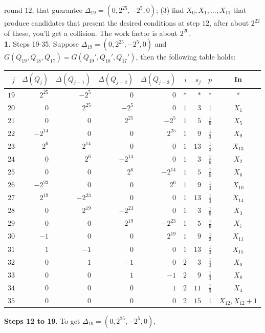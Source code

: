round $12$, that guarantee $\Delta_{19}= (0, 2^{25}, -2^5,0)$; (3)
find $X_0, X_1, \ldots , X_{11}$ that produce candidates that present the desired
conditions at step $12$, after about $2^{22}$ of these, you'll get a collision.
The work factor is about $2^{20}$. \\
{\bf 1.}  Steps 19-35.  Suppose 
$\Delta_{19}= (0, 2^{25}, -2^5,0)$ and 
$G(Q_{19}, Q_{18}, Q_{17})= G(Q_{19}', Q_{18}', Q_{17}')$, then the following table
holds:
\begin{center}
\begin{tabular} {|r|rrrr|rrcc|}
\hline
$j$&$\Delta(Q_{j})$&$\Delta(Q_{j-1})$&$\Delta(Q_{j-2})$&$\Delta(Q_{j-3})$&$i$&$s_j$&$p$&In\\
\hline
$19$& $2^{25}$&$-2^5$&$0$&$0$&$*$&$*$&$*$&$*$\\
$20$& $0$&$2^{25}$&$-2^5$&$0$&$1$&$3$&$1$&$X_{1}$\\
$21$& $0$&$0$&$2^{25}$&$-2^5$& $1$&$5$&${\frac 1 9}$&$X_{5}$\\
$22$& $-2^{14}$&$0$&$0$&$2^{25}$& $1$&$9$&${\frac 1 3}$&$X_{9}$\\
$23$& $2^6$&$-2^{14}$&$0$&$0$& $1$&$13$&${\frac 1 3}$&$X_{13}$\\
$24$& $0$&$2^6$&$-2^{14}$&$0$& $1$&$3$&${\frac 1 9}$&$X_{2}$\\
$25$& $0$&$0$&$2^6$&$-2^{14}$& $1$&$5$&${\frac 1 9}$&$X_{6}$\\
$26$& $-2^{23}$&$0$&$0$&$2^6$& $1$&$9$&${\frac 1 3}$&$X_{10}$\\
$27$& $2^{19}$&$-2^{23}$&$0$&$0$& $1$&$13$&${\frac 1 3}$&$X_{14}$\\
$28$& $0$&$2^{19}$&$-2^{23}$&$0$& $1$&$3$&${\frac 1 9}$&$X_{3}$\\
$29$& $0$&$0$&$2^{19}$&$-2^{23}$& $1$&$5$&${\frac 1 9}$&$X_{7}$\\
$30$& $-1$&$0$&$0$&$2^{19}$& $1$&$9$&${\frac 1 3}$&$X_{11}$\\
$31$& $1$&$-1$&$0$&$0$& $1$&$13$&${\frac 1 3}$&$X_{15}$\\
$32$& $0$&$1$&$-1$&$0$& $2$&$3$&${\frac 1 3}$&$X_{0}$\\
$33$& $0$&$0$&$1$&$-1$& $2$&$9$&${\frac 1 3}$&$X_{8}$\\
$34$& $0$&$0$&$0$&$1$& $2$&$11$&${\frac 1 3}$&$X_{4}$\\
$35$& $0$&$0$&$0$&$0$& $2$&$15$&$1$&$X_{12}, X_{12}+1$\\
\hline
\end{tabular}
\end{center}
{\bf Steps 12 to 19}.
To get $\Delta_{19}= (0, 2^{25}, -2^5,0)$,
